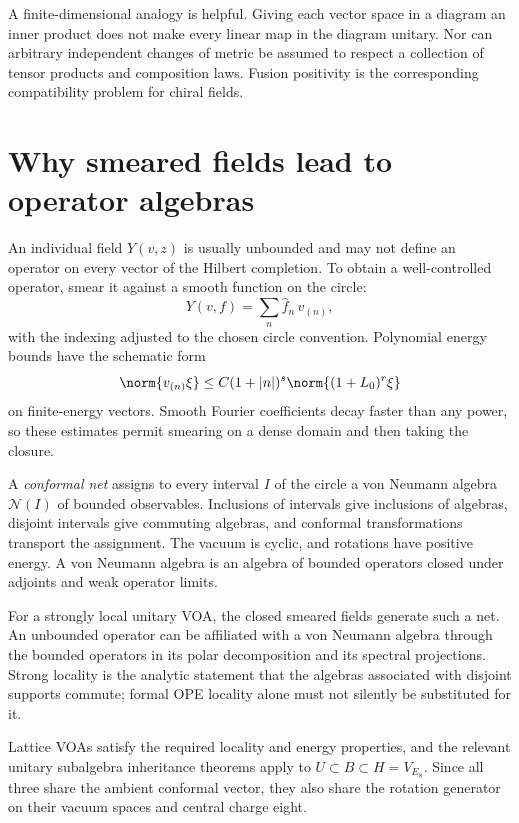 A finite-dimensional analogy is helpful. Giving each vector space
in a diagram an inner product does not make every linear map in
the diagram unitary. Nor can arbitrary independent changes of
metric be assumed to respect a collection of tensor products and
composition laws. Fusion positivity is the corresponding
compatibility problem for chiral fields.

\section{Why smeared fields lead to operator algebras}

An individual field $Y(v,z)$ is usually unbounded and may not define
an operator on every vector of the Hilbert completion. To obtain a
well-controlled operator, smear it against a smooth function on the
circle:
\[
 Y(v,f)=\sum_n\widehat f_n\,v_{(n)},
\]
with the indexing adjusted to the chosen circle convention.
Polynomial energy bounds have the schematic form
\begin{equation}
 \norm{v_{(n)}\xi}
 \le C(1+|n|)^s\norm{(1+L_0)^r\xi}
 \label{eq:unitarity-energy-bound}
\end{equation}
on finite-energy vectors. Smooth Fourier coefficients decay faster
than any power, so these estimates permit smearing on a dense
domain and then taking the closure.

A \emph{conformal net} assigns to every interval $I$ of the circle
a von Neumann algebra $\mathcal N(I)$ of bounded observables.
Inclusions of intervals give inclusions of algebras, disjoint
intervals give commuting algebras, and conformal transformations
transport the assignment. The vacuum is cyclic, and rotations have
positive energy. A von Neumann algebra is an algebra of bounded
operators closed under adjoints and weak operator limits.

For a strongly local unitary VOA, the closed smeared fields generate
such a net. An unbounded operator can be affiliated with a von
Neumann algebra through the bounded operators in its polar
decomposition and its spectral projections. Strong locality is
the analytic statement that the algebras associated with disjoint
supports commute; formal OPE locality alone must not silently be
substituted for it.

Lattice VOAs satisfy the required locality and energy properties,
and the relevant unitary subalgebra inheritance theorems apply to
$U\subset B\subset H=V_{E_8}$. Since all three share the ambient
conformal vector, they also share the rotation generator on their
vacuum spaces and central charge eight.

